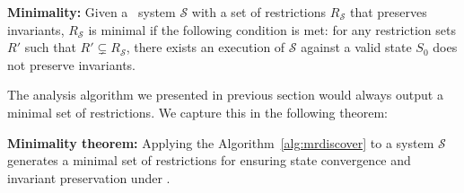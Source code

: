 \begin{mydef}
{\bf Minimality:} Given a \PRCAJ\ system $\mathscr{S}$
with a set of restrictions
$R_{\mathscr{S}}$ that preserves invariants, $R_{\mathscr{S}}$ is minimal if the
following condition is met:
for any restriction sets $R'$ such that $R' \subsetneq R_{\mathscr{S}}$,
there exists an execution of $\mathscr{S}$ against a valid state $S_0$ does not
preserve invariants.
\label{def:minimal}
\end{mydef}

The analysis algorithm we presented in previous section would always output a minimal set
of restrictions. We capture this in the following theorem:

\begin{theorem}
\label{them:minimality}
{\bf Minimality theorem:} Applying the Algorithm~\ref{alg:mrdiscover} to a system $\mathscr{S}$ generates
a minimal set of restrictions for ensuring state convergence and invariant preservation
under \PRCN.
\end{theorem}

